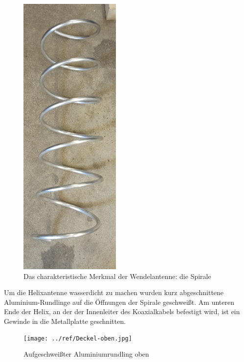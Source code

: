 \begin{figure}[h!]
	\centering
	\includegraphics[width=5cm,angle=90]{../ref/Spirale.jpg}
	\caption{Das charakteristische Merkmal der Wendelantenne: die Spirale}
	\label{fig:Spirale}
\end{figure}

Um die Helixantenne wasserdicht zu machen wurden kurz abgeschnittene Aluminium-Rundlinge auf die Öffnungen der Spirale geschweißt. Am unteren Ende der Helix, an der der Innenleiter des Koaxialkabels befestigt wird, ist ein Gewinde in die Metallplatte geschnitten.

\begin{figure}[h!]
	\centering
	\texttt{[image: ../ref/Deckel-oben.jpg]}
	\caption{Aufgeschweißter Aluminiumrundling oben}
	\label{fig:Deckel-Helix-Oben}
\end{figure}

